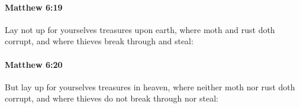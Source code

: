 		\paragraph{Matthew 6:19} %
			\label{MATTHEW-6-19}

			Lay not up for yourselves treasures upon earth, where moth and rust doth corrupt, and where thieves break through and steal:

			\begin{framed}
			\scriptsize
				\begin{compactdesc}
					\item[SBLG] 
				\end{compactdesc}
			\end{framed}

		\paragraph{Matthew 6:20} %
			\label{MATTHEW-6-20}

			But lay up for yourselves treasures in heaven, where neither moth nor rust doth corrupt, and where thieves do not break through nor steal:

